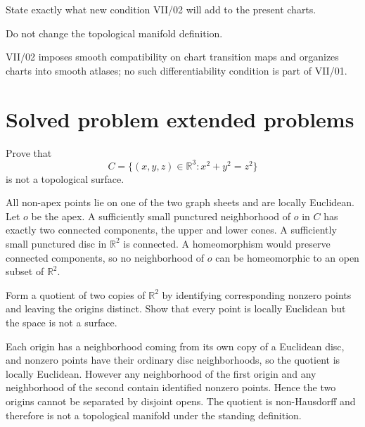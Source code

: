 \begin{exercise}\label{exr:vii01-24}
State exactly what new condition VII/02 will add to the present charts.
\end{exercise}
\begin{hint}
Do not change the topological manifold definition.
\end{hint}
\begin{solution}VII/02 imposes smooth compatibility on chart transition maps and organizes charts into smooth atlases; no such differentiability condition is part of VII/01.\end{solution}

\section{Solved problem extended problems}

\begin{problem}\label{prob:vii01-01}
Prove that
\[
C=\{(x,y,z)\in\mathbb R^3:x^2+y^2=z^2\}
\]
is not a topological surface.
\end{problem}
\begin{solution}
All non-apex points lie on one of the two graph sheets and are locally Euclidean.  Let \(o\) be the apex.  A sufficiently small punctured neighborhood of \(o\) in \(C\) has exactly two connected components, the upper and lower cones.  A sufficiently small punctured disc in \(\mathbb R^2\) is connected.  A homeomorphism would preserve connected components, so no neighborhood of \(o\) can be homeomorphic to an open subset of \(\mathbb R^2\).
\end{solution}

\begin{problem}\label{prob:vii01-02}
Form a quotient of two copies of \(\mathbb R^2\) by identifying corresponding nonzero points and leaving the origins distinct.  Show that every point is locally Euclidean but the space is not a surface.
\end{problem}
\begin{solution}
Each origin has a neighborhood coming from its own copy of a Euclidean disc, and nonzero points have their ordinary disc neighborhoods, so the quotient is locally Euclidean.  However any neighborhood of the first origin and any neighborhood of the second contain identified nonzero points.  Hence the two origins cannot be separated by disjoint opens.  The quotient is non-Hausdorff and therefore is not a topological manifold under the standing definition.
\end{solution}

